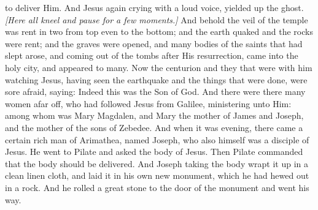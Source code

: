 {{to deliver Him. And Jesus again crying with a loud voice, yielded up the ghost.
\textit{[Here all kneel and pause for a few moments.]}
And behold the veil of the temple was rent in two from top even to the bottom; and the earth quaked and the rocks were rent; and the graves were opened, and many bodies of the saints that had slept arose, and coming out of the tombs after His resurrection, came into the holy city, and appeared to many. Now the centurion and they that were with him watching Jesus, having seen the earthquake and the things that were done, were sore afraid, saying: Indeed this was the Son of God. And there were there many women afar off, who had followed Jesus from Galilee, ministering unto Him: among whom was Mary Magdalen, and Mary the mother of James and Joseph, and the mother of the sons of Zebedee.  And when it was evening, there came a certain rich man of Arimathea, named Joseph, who also himself was a disciple of Jesus. He went to Pilate and asked the body of Jesus. Then Pilate commanded that the body should be delivered. And Joseph taking the body wrapt it up in a clean linen cloth, and laid it in his own new monument, which he had hewed out in a rock. And he rolled a great stone to the door of the monument and went his way.
  }
}
\newcommand{\offertory}{%
Impropérium exspectávit cor meum et misériam: et sustínui, qui simul mecum contristarétur, et non fuit: consolántem me quæsívi, et non invéni: et dedérunt in escam meam fel, et in siti mea potavérunt me acéto.
}
\newcommand{\offertoryTranslation}{%
Insult has broken my heart, and I am weak; I looked for sympathy, but there was none; for comforters, and I found none. Rather they put gall in My food and in My thirst they gave Me vinegar to drink.
}
\newcommand{\secret}{%
  \l{%
  Concéde, quǽsumus, Dómine: ut óculis tuæ majestátis munus oblátum, et grátiam nobis devotiónis obtíneat, et efféctum beátæ perennitátis acquírat.
  }
  \e{%
  Grant, we beseech You, almighty God, that the gift offered in the sight of Your majesty may obtain for us the grace of reverent devotion and assure us eternal happiness.
  }
  \perDominum
}
\newcommand{\communion}{%
Pater, si non potest hic calix transíre, nisi bibam illum: fiat volúntas tua.
}
\newcommand{\communionTranslation}{%
Father, if this cup cannot pass away, unless I drink it, Your will be done.
}
\newcommand{\postcommunion}{%
  \l{%
  Per hujus, Dómine, operatiónem mystérii: et vitia nostra purgéntur, et justa desidéria compleántur.
  }
  \e{%
  By the working of this sacred rite, O Lord, may our sins be erased and our just desires fulfilled.
  }
  \perDominum
}

